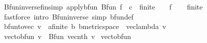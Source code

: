 \begin{isabellebody}
\endisatagproof
{\isafoldproof}%
%
\isadelimproof
\isanewline
%
\endisadelimproof
{}\isamarkupfalse%
%
\isadelimdocument
%
\endisadelimdocument
%
\isatagdocument
%
\isamarkuptrue%
%
\endisatagdocument
{\isafolddocument}%
%
\isadelimdocument
%
\endisadelimdocument
{}\isamarkupfalse%
\ Bfun{\isacharunderscore}{\kern0pt}inverse{\isacharunderscore}{\kern0pt}fin{\isacharbrackleft}{\kern0pt}simp{\isacharbrackright}{\kern0pt}{\isacharcolon}{\kern0pt}\ {\isachardoublequoteopen}apply{\isacharunderscore}{\kern0pt}bfun\ {\isacharparenleft}{\kern0pt}Bfun\ {\isacharparenleft}{\kern0pt}f\ {\isacharcolon}{\kern0pt}{\isacharcolon}{\kern0pt}\ {\isacharprime}{\kern0pt}c\ {\isacharcolon}{\kern0pt}{\isacharcolon}{\kern0pt}\ finite\ {\isasymRightarrow}\ {\isacharunderscore}{\kern0pt}{\isacharparenright}{\kern0pt}{\isacharparenright}{\kern0pt}\ {\isacharequal}{\kern0pt}\ f{\isachardoublequoteclose}\isanewline
%
\isadelimproof
\ \ %
\endisadelimproof
%
\isatagproof
{}\isamarkupfalse%
\ finite\ \isamarkupfalse%
\ {\isacharparenleft}{\kern0pt}fastforce\ intro{\isacharbang}{\kern0pt}{\isacharcolon}{\kern0pt}\ Bfun{\isacharunderscore}{\kern0pt}inverse\ simp{\isacharcolon}{\kern0pt}\ bfun{\isacharunderscore}{\kern0pt}def{\isacharparenright}{\kern0pt}%
\endisatagproof
{\isafoldproof}%
%
\isadelimproof
\isanewline
%
\endisadelimproof
\isanewline
{}\isamarkupfalse%
\ {\isachardoublequoteopen}bfun{\isacharunderscore}{\kern0pt}to{\isacharunderscore}{\kern0pt}vec\ {\isacharparenleft}{\kern0pt}v\ {\isacharcolon}{\kern0pt}{\isacharcolon}{\kern0pt}\ {\isacharparenleft}{\kern0pt}{\isacharprime}{\kern0pt}a{\isacharcolon}{\kern0pt}{\isacharcolon}{\kern0pt}finite{\isacharparenright}{\kern0pt}\ {\isasymRightarrow}\isactrlsub b\ {\isacharparenleft}{\kern0pt}{\isacharprime}{\kern0pt}b{\isacharcolon}{\kern0pt}{\isacharcolon}{\kern0pt}metric{\isacharunderscore}{\kern0pt}space{\isacharparenright}{\kern0pt}{\isacharparenright}{\kern0pt}\ {\isacharequal}{\kern0pt}\ vec{\isacharunderscore}{\kern0pt}lambda\ v{\isachardoublequoteclose}\isanewline
{}\isamarkupfalse%
\ {\isachardoublequoteopen}vec{\isacharunderscore}{\kern0pt}to{\isacharunderscore}{\kern0pt}bfun\ v\ {\isacharequal}{\kern0pt}\ Bfun\ {\isacharparenleft}{\kern0pt}vec{\isacharunderscore}{\kern0pt}nth\ v{\isacharparenright}{\kern0pt}{\isachardoublequoteclose}\isanewline
\isanewline
{}\isamarkupfalse%
\ vec{\isacharunderscore}{\kern0pt}to{\isacharunderscore}{\kern0pt}bfun\isanewline

\end{isabellebody}
